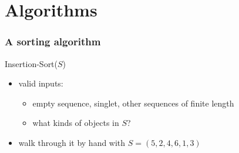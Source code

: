 %
%
%
%

\section{Algorithms}

\begin{frame}[fragile]
%
  \frametitle{A sorting algorithm}
%
    \begin{center}
      \begin{minipage}{.75\linewidth}
        \begin{algorithm}[H]
          \label{alg:insertion-sort}
%
          \dontprintsemicolon
          \setalcaphskip{0ex}
%
          \caption{\sc Insertion-Sort($S$)}
          \vspace{.5em}
%
          \vspace{.5em}
%
        \end{algorithm}
      \end{minipage}
    \end{center}
%
  \begin{itemize}
%
  \item valid inputs:
    \begin{itemize}
    \item empty sequence, singlet, other sequences of finite length
    \item what kinds of objects in $S$?
    \end{itemize}
%
  \item walk through it by hand with $S = (5, 2, 4, 6, 1, 3)$
%
  \end{itemize}
%
\end{frame}

